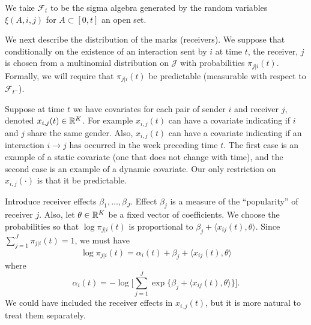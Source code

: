 \documentclass[aoas,preprint]{imsart}
\begin{document}
We take $\mathcal{F}_t$ to be the sigma algebra generated by the
random variables $\xi(A, i, j)$ for $A \subset [0,t]$ an open set.

We next describe the distribution of the marks (receivers). We suppose that
conditionally on the existence of an interaction sent by $i$ at time $t$, the
receiver, $j$ is chosen from a multinomial distribution on $\mathcal{J}$ with
probabilities $\pi_{j | i}(t)$. Formally, we will require that $\pi_{j |
i}(t)$ be predictable (measurable with respect to $\mathcal{F}_{t^-}$).

Suppose at time $t$ we have covariates for each pair of sender $i$ and
receiver $j$, denoted $x_{i,j}(t) \in \mathbb{R}^K$. For example $x_{i,j}(t)$ can
have a covariate indicating if $i$ and $j$ share the same gender. Also,
$x_{i,j}(t)$ can have a covariate indicating if an interaction $i \to j$ has
occurred in the week preceding time $t$. The first case is an example of a
static covariate (one that does not change with time), and the second case is
an example of a dynamic covariate. Our only restriction on $x_{i,j}(\cdot)$ is
that it be predictable.

Introduce receiver effects $\beta_1, \ldots, \beta_J$.  Effect $\beta_j$ is
a measure of the ``popularity'' of receiver $j$.  Also, let $\theta \in \mathbb{R}^K$ be a fixed vector of coefficients.  We choose the probabilities so that $\log \pi_{j|i}(t)$ is proportional to $\beta_j + \langle x_{ij}(t), \theta \rangle$.  Since $\sum_{j=1}^{J} \pi_{j|i}(t) = 1$, we must have
\[
    \log \pi_{j|i}(t)
    = \alpha_i(t) + \beta_j + \langle x_{ij}(t), \theta \rangle
\]
where
\[
    \alpha_i(t)
    = -\log\Big[
        \sum_{j=1}^J \exp\{\beta_j +  \langle x_{ij}(t), \theta \rangle\}
    \Big].
\]
We could have included the receiver effects in $x_{i,j}(t)$, but it is more
natural to treat them separately.





\end{document}

